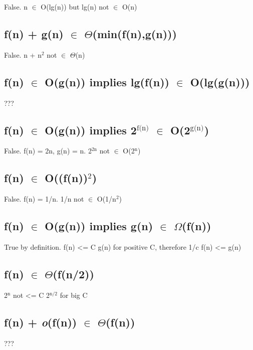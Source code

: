 \documentclass[12pt]{article}
\begin{document}
False. n $\in$ O(lg(n)) but lg(n) not $\in$ O(n)

\subsection{f(n) + g(n) $\in$ $\Theta$(min(f(n),g(n)))}
\label{sec-3-2}

False. n + n$^{\text{2}}$ not $\in$ $\Theta$(n)

\subsection{f(n) $\in$ O(g(n)) implies lg(f(n)) $\in$ O(lg(g(n)))}
\label{sec-3-3}

???

\subsection{f(n) $\in$ O(g(n)) implies 2$^{\text{f(n)}}$ $\in$ O(2$^{\text{g(n)}}$)}
\label{sec-3-4}

False. f(n) = 2n, g(n) = n. 2$^{\text{2n}}$ not $\in$ O(2$^{\text{n}}$)

\subsection{f(n) $\in$ O((f(n))$^{\text{2}}$)}
\label{sec-3-5}

False. f(n) = 1/n. 1/n not $\in$ O(1/n$^{\text{2}}$)

\subsection{f(n) $\in$ O(g(n)) implies g(n) $\in$ $\Omega$(f(n))}
\label{sec-3-6}

True by definition. f(n) <= C g(n) for positive C, therefore 1/c f(n)
<= g(n)

\subsection{f(n) $\in$ $\Theta$(f(n/2))}
\label{sec-3-7}

2$^{\text{n}}$ not <= C 2$^{\text{n/2}}$ for big C

\subsection{f(n) + \textit{o}(f(n)) $\in$ $\Theta$(f(n))}
\label{sec-3-8}

???
\end{document}
